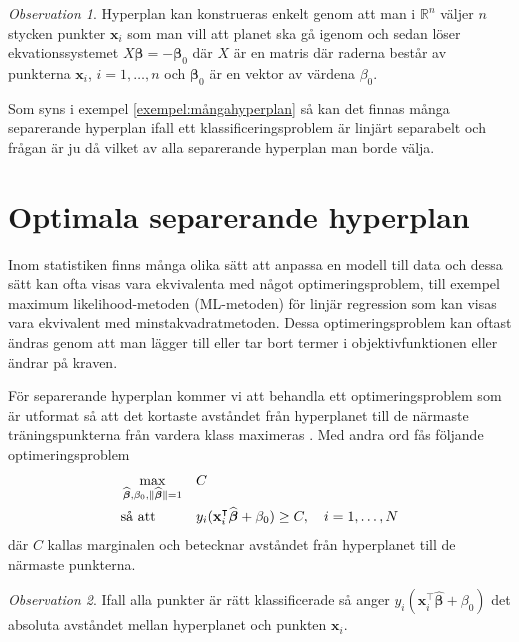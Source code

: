 \documentclass[a4paper, 12pt]{report}
\theoremstyle{definition}
\theoremstyle{remark}
\newtheorem*{rem}{Observation}
\newcommand{\bfbeta}{{\boldsymbol{\beta}}}
\begin{document}
\begin{rem}
	Hyperplan kan konstrueras enkelt genom att man i $\mathbb{R}^n$ väljer $n$ stycken punkter $\mathbf{x}_i$ som man vill att planet ska gå igenom och sedan löser ekvationssystemet $X\bfbeta=-\bfbeta_0$ där $X$ är en matris där raderna består av punkterna $\mathbf{x}_i$, $i=1,\dots, n$ och $\bfbeta_0$ är en vektor av värdena $\beta_0$.
\end{rem}

Som syns i exempel \ref{exempel:mångahyperplan} så kan det finnas många separerande hyperplan ifall ett klassificeringsproblem är linjärt separabelt och frågan är ju då vilket av alla separerande hyperplan man borde välja.

\section{Optimala separerande hyperplan}
Inom statistiken finns många olika sätt att anpassa en modell till data och dessa sätt kan ofta visas vara ekvivalenta med något optimeringsproblem, till exempel maximum likelihood-metoden (ML-metoden) för linjär regression som kan visas vara ekvivalent med minstakvadratmetoden. %
Dessa optimeringsproblem kan oftast ändras genom att man lägger till eller tar bort termer i objektivfunktionen eller ändrar på kraven.

För separerande hyperplan kommer vi att behandla ett optimeringsproblem som är utformat så att det kortaste avståndet från hyperplanet till de närmaste träningspunkterna från vardera klass maximeras \cite{Vapnik96}. Med andra ord fås följande optimeringsproblem
\begin{equation}\label{opt:optimalmargin1}
\begin{aligned}
	& \operatornamewithlimits{max}_{\widehat{\bfbeta},\beta_0,\|\widehat{\bfbeta}\|=1} & & C\\
	& \text{så att} & & y_i(\mathbf{x}_i^\intercal\widehat{\bfbeta}+\beta_0)\geq C,\quad i=1,\dots,N
\end{aligned}
\end{equation}
där $C$ kallas marginalen och betecknar avståndet från hyperplanet till de närmaste punkterna.
\begin{rem}
	Ifall alla punkter är rätt klassificerade så anger $y_i(\mathbf{x}^\intercal_i\widehat{\bfbeta}+\beta_0)$ det absoluta avståndet mellan hyperplanet och punkten $\mathbf{x}_i$.
\end{rem}
\end{document}
